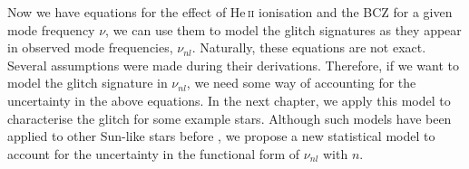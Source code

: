 Now we have equations for the effect of He\,\textsc{ii} ionisation and the BCZ for a given mode frequency \(\nu\), we can use them to model the glitch signatures as they appear in observed mode frequencies, \(\nu_{nl}\). Naturally, these equations are not exact. Several assumptions were made during their derivations. Therefore, if we want to model the glitch signature in \(\nu_{nl}\), we need some way of accounting for the uncertainty in the above equations. In the next chapter, we apply this model to characterise the glitch for some example stars. Although such models have been applied to other Sun-like stars before \citep[e.g.][]{Mazumdar.Monteiro.ea2014,Verma.Faria.ea2014}, we propose a new statistical model to account for the uncertainty in the functional form of \(\nu_{nl}\) with \(n\).
